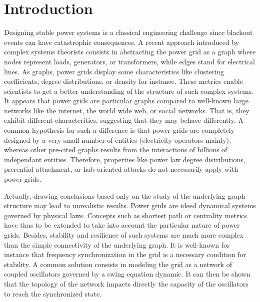 \documentclass[conference]{IEEEtran}
\begin{document}
\IEEEpeerreviewmaketitle


%
%
\section{Introduction}
\label{sec:introduction}

Designing stable power systems is a classical engineering challenge since blackout events can have catastrophic consequences. A recent approach introduced by complex systems theorists consists in abstracting the power grid as a graph where nodes represent loads, generators, or transformers, while edges stand for electrical lines. As graphs, power grids display some characteristics like clustering coefficients, degree distributions, or density for instance. These metrics enable scientists to get a better understanding of the structure of such complex systems. It appears that power grids are particular graphs compared to well-known large networks like the internet, the world wide web, or social networks. That is, they exhibit different characteritics, suggesting that they may behave differently. A common hypothesis for such a difference is that power grids are completely designed by a very small number of entities (electricity operators mainly), whereas other pre-cited graphs results from the interactions of billions of independant entities. Therefore, properties like power law degree distributions, prerential attachment, or hub oriented attacks do not necessarily apply with power grids.

Actually, drawing conclusions based only on the study of the underlying graph structure may lead to unrealistic results. Power grids are ideed dynamical systems governed by physical laws. Concepts such as shortest path or centrality metrics have thus to be extended to take into account the particular nature of power grids. Besides, stability and resilience of such systems are much more complex than the simple connectivity of the underlying graph. It is well-known for instance that frequency synchronization in the grid is a necessary condition for stability. A common solution consists in modeling the grid as a network of coupled oscillators governed by a swing equation dynamic. It can then be shown that the topology of the network impacts directly the capacity of the oscillators to reach the synchronized state.
\end{document}
